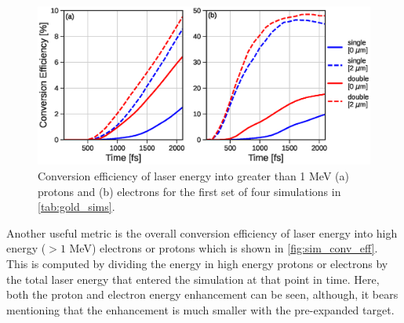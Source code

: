 \begin{figure}
	\centering
	\includegraphics[width=0.9\linewidth]{planning/images/titan/conversion_efficiency.eps}
	\caption{Conversion efficiency of laser energy into greater than 1 MeV (a) protons and (b) electrons for the first set of four simulations in \autoref{tab:gold_sims}.}
	\label{fig:sim_conv_eff}
\end{figure}

Another useful metric is the overall conversion efficiency of laser energy into high energy ($> 1 $ MeV) electrons or protons which is shown in \autoref{fig:sim_conv_eff}. This is computed by dividing the energy in high energy protons or electrons by the total laser energy that entered the simulation at that point in time. Here, both the proton and electron energy enhancement can be seen, although, it bears mentioning that the enhancement is much smaller with the pre-expanded target. 

